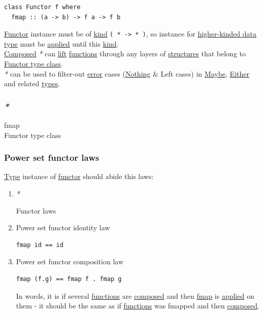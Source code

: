 \documentclass[a4paper,14pt,oneside]{book}
\begin{document}
\begin{verbatim}
class Functor f where
  fmap :: (a -> b) -> f a -> f b
\end{verbatim}

\hyperref[orgd17eb6d]{Functor} instance must be of \hyperref[org4c84b44]{kind} \texttt{( * -> * )}, so instance for \hyperref[org7cc39eb]{higher-kinded data type} must be \hyperref[org4e3dfe3]{applied} until this \hyperref[org4c84b44]{kind}.\\

\hyperref[org08ee05c]{Composed} \emph{*} can \hyperref[orgcdc6e35]{lift} \hyperref[org788d18f]{functions} through any layers of \hyperref[org2c7f064]{structures} that belong to \hyperref[orgcf43743]{Functor type class}.\\

\emph{*} can be used to filter-out \hyperref[orga8fca48]{error} cases (\hyperref[orga006e70]{Nothing} \& Left cases) in \hyperref[orgc66adf1]{Maybe}, \hyperref[orga1183c5]{Either} and related \hyperref[org47bd1c4]{types}.\\

\subsubsection{\emph{*}}
\label{sec:org0d64f58}

\label{orgd75179a}fmap\\
\label{orgcf43743}Functor type class\\

\subsubsection{\label{orgbf8ee5e}Power set functor laws}
\label{sec:orge684786}
\hyperref[org35b9249]{Type} instance of \hyperref[orgd17eb6d]{functor} should abide this laws:\\

\begin{enumerate}
\item \emph{*}
\label{sec:orgefa131d}

\label{org21171f5}Functor laws\\

\item \label{org7cd5da0}Power set functor identity law
\label{sec:org4a53bc9}
\begin{verbatim}
fmap id == id
\end{verbatim}

\item \label{orgbc247b1}Power set functor composition law
\label{sec:orgf4f1c9f}
\begin{verbatim}
fmap (f.g) == fmap f . fmap g
\end{verbatim}
In words, it is if several \hyperref[org788d18f]{functions} are \hyperref[org08ee05c]{composed} and then \hyperref[orgd75179a]{fmap} is \hyperref[org4e3dfe3]{applied} on them - it should be the same as if \hyperref[org788d18f]{functions} was fmapped and then \hyperref[org08ee05c]{composed}.\\
\end{enumerate}
\end{document}
